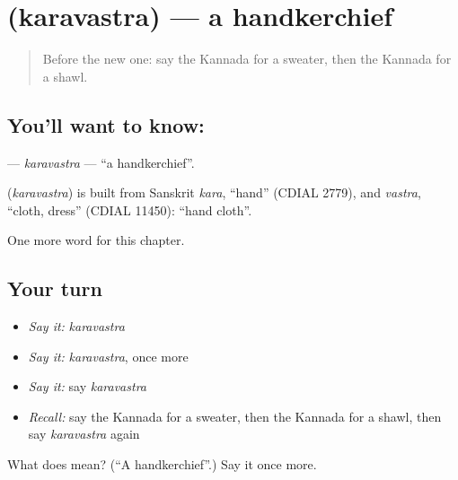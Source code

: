 \section[\texorpdfstring{\kn{ಕರವಸ್ತ್ರ} (karavastra)}{ಕರವಸ್ತ್ರ (karavastra)}]{ (karavastra) — a handkerchief}

\label{lesson:KA-C259-karavastra}



\begin{quote}
Before the new one: say the Kannada for a sweater, then the Kannada for a shawl.
\end{quote}

\subsection*{You'll want to know: }
\textbf{} — \emph{karavastra} — \textquotedblleft{}a handkerchief\textquotedblright{}.

\begin{cousinweb}
\textbf{} (\emph{karavastra}) is built from Sanskrit \emph{kara}, \textquotedblleft{}hand\textquotedblright{} (CDIAL 2779), and \emph{vastra}, \textquotedblleft{}cloth, dress\textquotedblright{} (CDIAL 11450): \textquotedblleft{}hand cloth\textquotedblright{}.
\end{cousinweb}

\begin{grammarlens}[title={What you've built}]
One more word for this chapter.
\end{grammarlens}

\subsection*{Your turn}
\begin{itemize}
\raggedright
  \item \emph{Say it:} \emph{karavastra}
  \item \emph{Say it:} \emph{karavastra}, once more
  \item \emph{Say it:} say \emph{karavastra}
  \item \emph{Recall:} say the Kannada for a sweater, then the Kannada for a shawl, then say \emph{karavastra} again
\end{itemize}

\begin{tcolorbox}[breakable,colback=teal!4,colframe=teal!35!black,title={Before you move on}]
What does  mean? (\textquotedblleft{}A handkerchief\textquotedblright{}.) Say it once more.
\end{tcolorbox}
